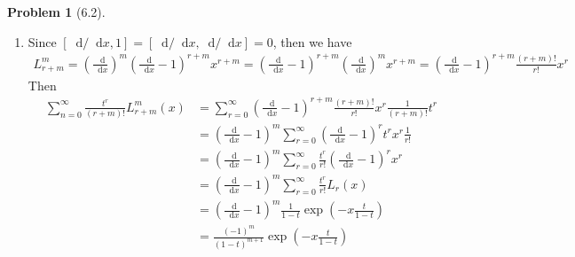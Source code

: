 \documentclass[twoside,11pt]{article}
\renewcommand*\d{\mathop{}\!\mathrm{d}}
\theoremstyle{definition}
\newtheorem{problem}{Problem}
\theoremstyle{remark}
\begin{document}
\begin{problem}[6.2]
\begin{enumerate}[label=(\alph*)]
        \item Since $[\d/\d x, 1]=[\d/\d x, \d/\d x]=0$, then we have
        \begin{align*}
            L_{r+m}^m = \left(\frac{\d}{\d x}\right)^m \left(
                \frac{\d }{\d x}-1
            \right)^{r+m}  x^{r+m}
            =  \left(
                \frac{\d }{\d x}-1
            \right)^{r+m} \left(\frac{\d}{\d x}\right)^m x^{r+m}
            = \left(
                \frac{\d }{\d x}-1
            \right)^{r+m} \frac{(r+m)!}{r!} x^r
        \end{align*}
        Then
        \begin{align*}
            \sum_{n=0}^\infty \frac{t^r}{(r+m)!}L_{r+m}^m(x)
            &= \sum_{r=0}^\infty \left(\frac{\d }{\d x} - 1\right)^{r+m}\frac{(r+m)!}{r!} x^r\frac{1}{(r+m)!}t^r\\
            &= \left(\frac{\d }{\d x} - 1\right)^m \sum_{r=0}^\infty\left(\frac{\d }{\d x} - 1\right)^r t^rx^r\frac{1}{r!}\\
            &= \left(\frac{\d }{\d x} - 1\right)^m \sum_{r=0}^\infty\frac{t^r}{r!}\left(\frac{\d }{\d x} - 1\right)^r x^r\\
            &= \left(\frac{\d }{\d x} - 1\right)^m \sum_{r=0}^\infty \frac{t^r}{r!} L_r(x) \\
            &= \left(\frac{\d }{\d x} - 1\right)^m \frac{1}{1-t}\exp\left(-x\frac{t}{1-t}\right)\\
            &= \frac{(-1)^m}{(1-t)^{m+1}}\exp\left(-x\frac{t}{1-t}\right)
        \end{align*}

    \end{enumerate}
\end{problem}








\end{document}
